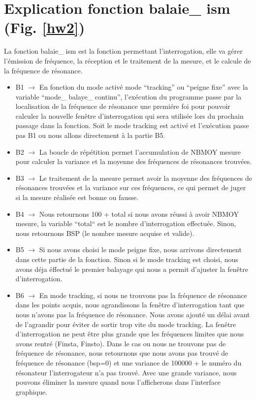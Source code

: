 \documentclass[a4paper]{article}
\begin{document}
\section{Explication fonction balaie\_ ism (Fig. \ref{hw2})}
La fonction balaie\_ ism est la fonction permettant l'interrogation, elle va g\'erer l'\'emission de fr\'equence, la r\'eception et 
le traitement de la mesure, et le calcule de la fr\'equence de r\'esonance.
\begin{itemize}
\item B1 $\rightarrow$ En fonction du mode activ\'e mode ``tracking'' ou ``peigne fixe'' avec la variable ``mode\_ balaye\_ continu'', l'ex\'ecution 
du programme passe par la localisation de la fr\'equence de r\'esonance une premi\'ere foi pour pouvoir calculer la nouvelle fen\^etre d'interrogation 
qui sera utilis\'ee lors du prochain passage dans la fonction. Soit le mode tracking est activ\'e et l'ex\'ecution passe pas B1 ou nous allons directement 
\`a la partie B5.
\item B2 $\rightarrow$ La boucle de r\'ep\'etition permet l'accumulation de NBMOY mesure pour calculer la variance et la moyenne des fr\'equences 
de r\'esonances trouv\'ees.
\item B3 $\rightarrow$ Le traitement de la mesure permet avoir la moyenne des fr\'equences de r\'esonances trouv\'ees et la variance sur ces fr\'equences, 
ce qui permet de juger si la mesure r\'ealis\'ee est bonne ou fausse.
\item B4 $\rightarrow$ Nous retournons 100 + total si nous avons r\'eussi \`a avoir NBMOY mesure, la variable ``total``  est le nombre 
d'interrogation effectu\'ee. Sinon, nous retournons BSP (le nombre mesure acquise et valide).
\item B5 $\rightarrow$ Si nous avons choisi le mode peigne fixe, nous arrivons directement dans cette partie de la fonction. Sinon si le mode tracking 
est choisi, nous avons d\'eja \'effectu\'e le premier balayage qui nous a permit d'ajuster la fen\^etre d'interrogation.
\item B6 $\rightarrow$ En mode tracking, si nous ne trouvons pas la fr\'equence de r\'esonance dans les points acquis, nous agrandissons la fen\^etre 
d'interrogation tant que nous n'avons pas la fr\'equence de r\'esonance. Nous avons ajout\'e un d\'elai avant de l'agrandir pour \'eviter de sortir trop 
vite du mode tracking. La fen\^etre d'interrogation ne peut \^etre plus grande que les fr\'equences limites que nous avons rentr\'e (Finsta, Finsto). 
Dans le cas ou nous ne trouvons pas de fr\'equence de r\'esonance, nous retournons que nous avons pas trouv\'e de fr\'equence de r\'esonance (bsp=0)
 et une variance de 100000 + le num\'ero du r\'esonateur l'interrogateur n'a pas trouv\'e. Avec une grande variance, nous pouvons \'eliminer la mesure quand nous l'afficherons dans l'interface graphique.
\end{itemize}
\end{document}

